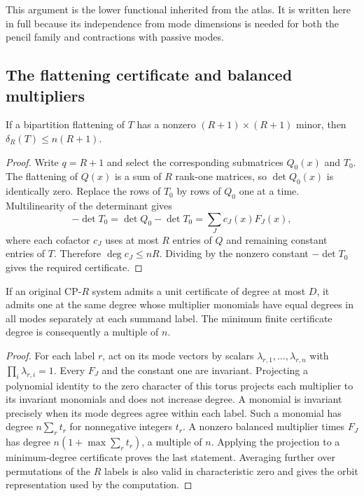 This argument is the lower functional inherited from the atlas. It is written here in full because its independence from mode dimensions is needed for both the pencil family and contractions with passive modes.

\subsection{The flattening certificate and balanced multipliers}

\begin{lemma}\label{lem:minor}
If a bipartition flattening of $T$ has a nonzero $(R+1)\times(R+1)$ minor, then $\delta_R(T)\le n(R+1)$.
\end{lemma}

\begin{proof}
Write $q=R+1$ and select the corresponding submatrices $Q_0(x)$ and $T_0$. The flattening of $Q(x)$ is a sum of $R$ rank-one matrices, so $\det Q_0(x)$ is identically zero. Replace the rows of $T_0$ by rows of $Q_0$ one at a time. Multilinearity of the determinant gives
\[
 -\det T_0=\det Q_0-\det T_0=\sum_J c_J(x)F_J(x),
\]
where each cofactor $c_J$ uses at most $R$ entries of $Q$ and remaining constant entries of $T$. Therefore $\deg c_J\le nR$. Dividing by the nonzero constant $-\det T_0$ gives the required certificate.
\end{proof}

\begin{lemma}\label{lem:balance}
If an original CP-$R$ system admits a unit certificate of degree at most $D$, it admits one at the same degree whose multiplier monomials have equal degrees in all modes separately at each summand label. The minimum finite certificate degree is consequently a multiple of $n$.
\end{lemma}

\begin{proof}
For each label $r$, act on its mode vectors by scalars $\lambda_{r,1},\ldots,\lambda_{r,n}$ with $\prod_i\lambda_{r,i}=1$. Every $F_J$ and the constant one are invariant. Projecting a polynomial identity to the zero character of this torus projects each multiplier to its invariant monomials and does not increase degree. A monomial is invariant precisely when its mode degrees agree within each label. Such a monomial has degree $n\sum_r t_r$ for nonnegative integers $t_r$. A nonzero balanced multiplier times $F_J$ has degree $n(1+\max\sum_r t_r)$, a multiple of $n$. Applying the projection to a minimum-degree certificate proves the last statement. Averaging further over permutations of the $R$ labels is also valid in characteristic zero and gives the orbit representation used by the computation.
\end{proof}

